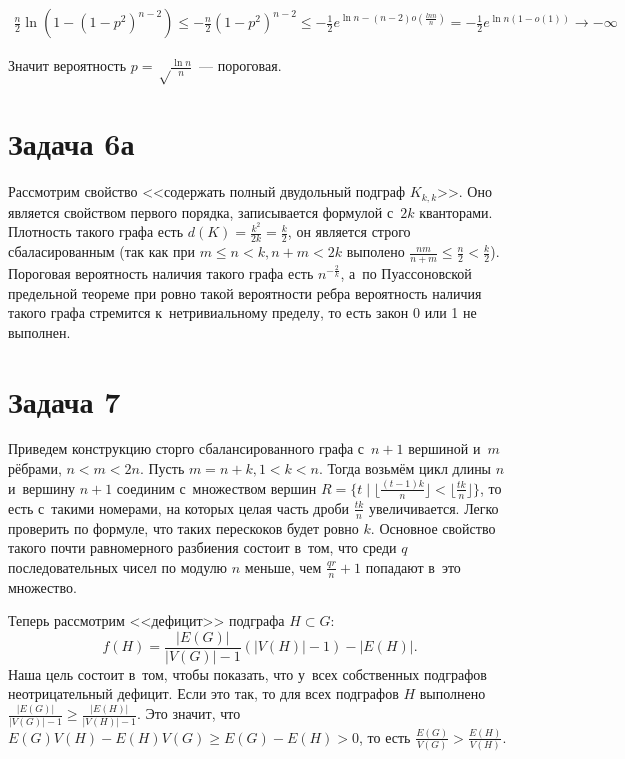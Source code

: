 \documentclass{article}
\theoremstyle{definition}
\theoremstyle{remark}
\renewcommand{\le}{\leqslant}
\renewcommand{\ge}{\geqslant}
\begin{document}
\begin{multline*}
	\frac{n}{2} \ln(1 - (1 - p^2)^{n-2}) \le -\frac{n}{2} (1 - p^2)^{n-2} \le -\frac{1}{2} e^{\ln n -
	(n - 2) o\left( \frac{ln n}{n}\right)} = -\frac{1}{2} e^{\ln n (1 - o(1))} \rightarrow -\infty
\end{multline*}

Значит вероятность $p = \sqrt\frac{\ln n}{n}$~--- пороговая.

\section*{Задача 6а}

Рассмотрим свойство <<содержать полный двудольный подграф $K_{k, k}$>>. Оно является свойством
первого порядка, записывается формулой с~$2k$ кванторами. Плотность такого графа есть $d(K) =
\frac{k^2}{2k}=\frac{k}{2}$, он является строго сбаласированным (так как при $m \le n < k,
n + m < 2k$ выполено $\frac{nm}{n+m} \le \frac{n}{2} < \frac{k}{2}$). Пороговая вероятность
наличия такого графа есть $n^{-\frac{2}{k}}$, а~по Пуассоновской предельной теореме при ровно такой
вероятности ребра вероятность наличия такого графа стремится к~нетривиальному пределу, то есть
закон 0 или 1 не выполнен.

\section*{Задача 7}

Приведем конструкцию сторго сбалансированного графа с~$n+1$ вершиной и~$m$ рёбрами, $n < m < 2n$.
Пусть $m = n + k, 1 < k < n$. Тогда возьмём цикл длины $n$ и~вершину $n + 1$ соединим с~множеством
вершин $R = \{t \mid \lfloor \frac{(t-1)k}{n} \rfloor < \lfloor \frac{tk}{n} \rfloor \}$, то есть
с~такими номерами, на которых целая часть дроби $\frac{tk}{n}$ увеличивается. Легко проверить по
формуле, что таких перескоков будет ровно $k$. Основное свойство такого почти равномерного разбиения
состоит в~том, что среди $q$ последовательных чисел по модулю $n$ меньше, чем $\frac{qr}{n} + 1$
попадают в~это множество.

Теперь рассмотрим <<дефицит>> подграфа $H \subset G$:
$$f(H) = \frac{|E(G)|}{|V(G)|-1} (|V(H)| - 1) - |E(H)|.$$
Наша цель состоит в~том, чтобы показать, что у~всех собственных подграфов неотрицательный
дефицит. Если это так, то для всех подграфов $H$ выполнено $\frac{|E(G)|}{|V(G)|-1} \ge
\frac{|E(H)|}{|V(H)|-1}$. Это значит, что $E(G)V(H) - E(H)V(G) \ge E(G) - E(H) > 0$, то есть
$\frac{E(G)}{V(G)} > \frac{E(H)}{V(H)}$.
\end{document}
